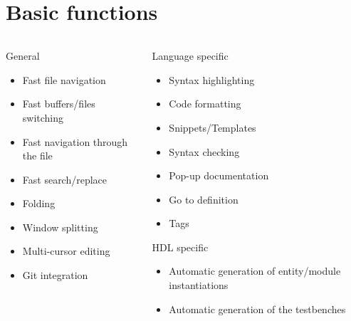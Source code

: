 \documentclass[aspectratio=169]{beamer}
\begin{document}
\section*{Basic functions}
\begin{frame}{\secname}
  \begin{columns}
    \begin{column}{0.5\textwidth}
  \begin{block}{General}
    \begin{itemize}
        \item Fast file navigation
        \item Fast buffers/files switching
        \item Fast navigation through the file
        \item Fast search/replace
        \item Folding
        \item Window splitting
        \item Multi-cursor editing
        \item Git integration
    \end{itemize}
  \end{block}
      
    \end{column}


    \begin{column}{0.5\textwidth}

      \begin{block}{Language specific}
        \begin{itemize}
          \item Syntax highlighting
          \item Code formatting
          \item Snippets/Templates
          \item Syntax checking
          \item Pop-up documentation
          \item Go to definition
          \item Tags
        \end{itemize}
      \end{block}
      \begin{block}{HDL specific}
        \begin{itemize}
          \item Automatic generation of entity/module instantiations
          \item Automatic generation of the testbenches
        \end{itemize}
      \end{block}
      
    \end{column}
  \end{columns}
    
\end{frame}
\end{document}
